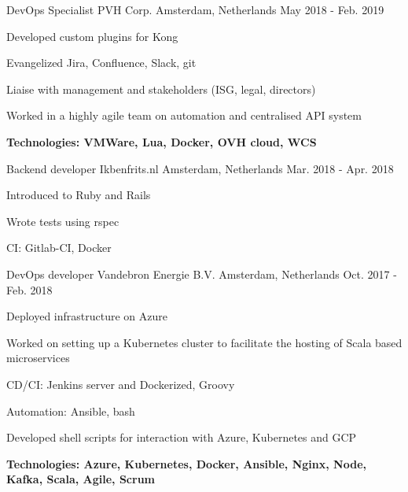 \begin{cventries}
\cventry
{DevOps Specialist} %
{PVH Corp.} %
{Amsterdam, Netherlands} %
{May 2018 - Feb. 2019} %
{ %
	\begin{cvitems}
		\item {Developed custom plugins for Kong}
		\item {Evangelized Jira, Confluence, Slack, git}
		\item {Liaise with management and stakeholders (ISG, legal, directors)}
		\item {Worked in a highly agile team on automation and centralised API system}
		\item {\bfseries{Technologies:} VMWare, Lua, Docker, OVH cloud, WCS}
	\end{cvitems}
}

\cventry
{Backend developer} %
{Ikbenfrits.nl} %
{Amsterdam, Netherlands} %
{Mar. 2018 - Apr. 2018} %
{ %
\begin{cvitems}
\item {Introduced to Ruby and Rails}
\item {Wrote tests using rspec}
\item {CI: Gitlab-CI, Docker}
\end{cvitems}
}


\cventry
{DevOps developer} %
{Vandebron Energie B.V.} %
{Amsterdam, Netherlands} %
{Oct. 2017 - Feb. 2018} %
{ %
\begin{cvitems}
\item {Deployed infrastructure on Azure}
\item {Worked on setting up a Kubernetes cluster to facilitate the hosting of Scala based microservices}
\item {CD/CI: Jenkins server and Dockerized, Groovy}
\item {Automation: Ansible, bash}
\item {Developed shell scripts for interaction with Azure, Kubernetes and GCP}
\item {\bfseries{Technologies:} Azure, Kubernetes, Docker, Ansible, Nginx, Node, Kafka, Scala, Agile, Scrum}
\end{cvitems}
}



\end{cventries}
